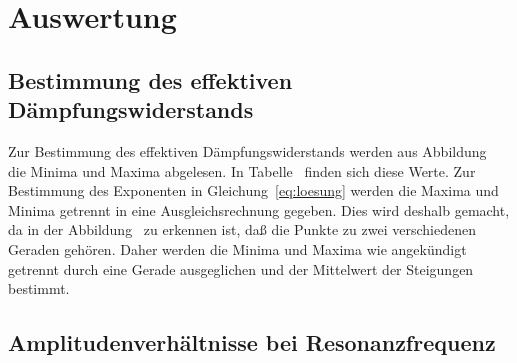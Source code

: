 
\section{Auswertung}

\subsection{Bestimmung des  effektiven Dämpfungswiderstands} Zur
Bestimmung des effektiven Dämpfungswiderstands werden aus
Abbildung~ die Minima und Maxima abgelesen. In
Tabelle~ finden sich diese Werte. Zur Bestimmung
des Exponenten in Gleichung~\eqref{eq:loesung} werden die Maxima und
Minima getrennt in eine Ausgleichsrechnung gegeben. Dies wird deshalb
gemacht, da in der Abbildung~ zu erkennen ist, daß
die Punkte zu zwei verschiedenen Geraden gehören. Daher werden die
Minima und Maxima wie angekündigt getrennt durch eine Gerade
ausgeglichen und der Mittelwert der Steigungen bestimmt.


\subsection{Amplitudenverhältnisse bei Resonanzfrequenz}

